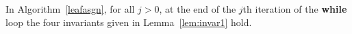 \documentclass[MS,synopsis]{iitmdiss}
\begin{document}

\begin{lemma}
  \label{lem:invar3}
  In Algorithm~\ref{leafasgn}, for all $j > 0$, at the end of the
  $j$th iteration of the {\bf while} loop the four invariants given in
  Lemma~\ref{lem:invar1} hold.
\end{lemma}




\end{document}
